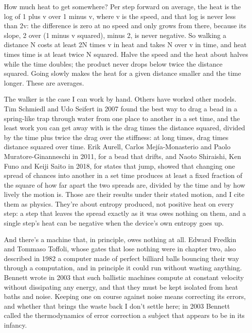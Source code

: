 \documentclass[11pt,twoside]{article}
\theoremstyle{thielethm}
\theoremstyle{thieledef}
\theoremstyle{thieledef}
\theoremstyle{thieledef}
\theoremstyle{thielethm}
\theoremstyle{thieleobs}
\theoremstyle{thielethm}
\begin{document}
How much heat to get somewhere? Per step forward on average, the heat is the log of 1 plus v over 1 minus v, where v is the speed, and that log is never less than 2v: the difference is zero at no speed and only grows from there, because its slope, 2 over (1 minus v squared), minus 2, is never negative. So walking a distance N costs at least 2N times v in heat and takes N over v in time, and heat times time is at least twice N squared. Halve the speed and the heat about halves while the time doubles; the product never drops below twice the distance squared. Going slowly makes the heat for a given distance smaller and the time longer. These are averages.

The walker is the case I can work by hand. Others have worked other models. Tim Schmiedl and Udo Seifert in 2007 found the best way to drag a bead in a spring-like trap through water from one place to another in a set time, and the least work you can get away with is the drag times the distance squared, divided by the time plus twice the drag over the stiffness: at long times, drag times distance squared over time. Erik Aurell, Carlos Mejía-Monasterio and Paolo Muratore-Ginanneschi in 2011, for a bead that drifts, and Naoto Shiraishi, Ken Funo and Keiji Saito in 2018, for states that jump, showed that changing one spread of chances into another in a set time produces at least a fixed fraction of the square of how far apart the two spreads are, divided by the time and by how lively the motion is. Those are their results under their stated motion, and I cite them as physics. They're about entropy produced, not positive heat on every step: a step that leaves the spread exactly as it was owes nothing on them, and a single step's heat can be negative when the device's own entropy goes up.

And there's a machine that, in principle, owes nothing at all. Edward Fredkin and Tommaso Toffoli, whose gates that lose nothing were in chapter two, also described in 1982 a computer made of perfect billiard balls bouncing their way through a computation, and in principle it could run without wasting anything. Bennett wrote in 2003 that such ballistic machines compute at constant velocity without dissipating any energy, and that they must be kept isolated from heat baths and noise. Keeping one on course against noise means correcting its errors, and whether that brings the waste back I don't settle here; in 2003 Bennett called the thermodynamics of error correction a subject that appears to be in its infancy.
\end{document}
